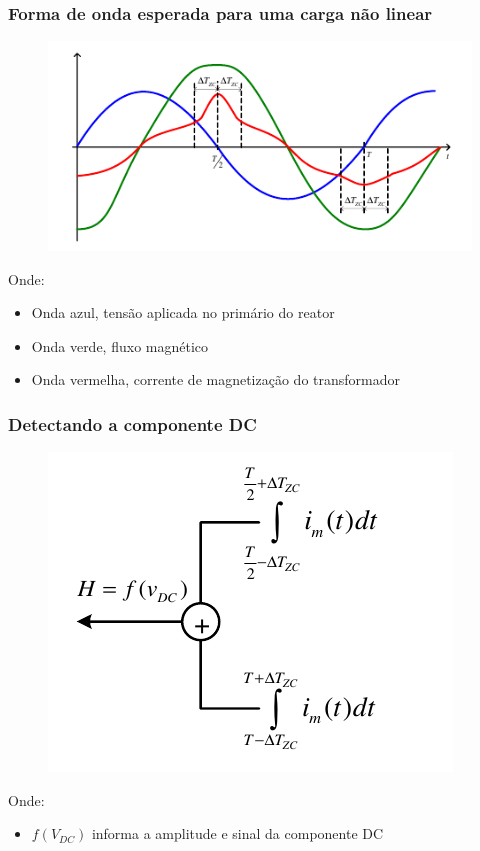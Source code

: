\documentclass{beamer}
\begin{document}
\begin{frame}
    \frametitle{Forma de onda esperada para uma carga não linear}

    \begin{figure}
        \includegraphics[width=.8\linewidth]{fig2.png}
    \end{figure}
    Onde:
    \begin{itemize}
        \item Onda azul, tensão aplicada no primário do reator
        \item Onda verde, fluxo magnético
        \item Onda vermelha, corrente de magnetização do transformador
    \end{itemize}
\end{frame}

\begin{frame}
    \frametitle{Detectando a componente DC}

    \begin{figure}
        \includegraphics[width=.6\linewidth]{fig3.png}
    \end{figure}

    Onde: 
    \begin{itemize}
        \item $f(V_{DC})$ informa a amplitude e sinal da componente DC
    \end{itemize}

\end{frame}
\end{document}
